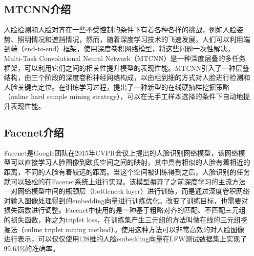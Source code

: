\subsection{MTCNN介绍}
人脸检测和人脸对齐在一些不受控制的条件下有着各种各样的挑战，例如人脸姿势、照明情况和遮挡情况，然而，随着深度学习技术的飞速发展，人们可以利用端到端（end-to-end）框架，使用深度卷积网络模型，将这些问题一次性解决。Multi-Task Convolutional Neural Network（MTCNN\cite{mtcnn}）是一种深度层叠的多任务框架，可以利用它们之间的相关性提升模型的表现性能。MTCNN引入了一种层叠结构，由三个阶段的深度卷积神经网络构成，以由粗到细的方式对人脸进行检测和人脸关键点定位。在训练学习过程，提出了一种新型的在线硬抽样挖掘策略（online hard sample mining strategy），可以在无手工样本选择的条件下自动地提升表现性能。

\subsection{Facenet介绍}

Facenet\cite{facenet}是Google团队在2015年CVPR会议上提出的人脸识别网络模型，该网络模型可以直接学习人脸图像到欧氏空间之间的映射，其中具有相似的人脸有着相近的距离，不同的人脸有着较远的距离。当这个空间被训练得到之后，人脸识别的任务就可以轻松的在Facenet系统上进行实现。该模型摒弃了之前深度学习的主流方法---对网络模型中间的瓶颈层（bottleneck layer）进行训练，而是通过深度卷积网络对输入图像处理得到的embedding向量进行训练优化。改变了训练目标，也需要对损失函数进行调整。Facenet中使用的是一种基于粗略对齐的匹配、不匹配三元组的损失函数，称之为triplet loss，在训练集产生三元组的方法叫做在线的三元组挖掘法（online triplet mining method）。使用这种方法可以非常高效的对人脸图像进行表示，可以仅仅使用128维的人脸embedding向量在LFW测试数据集上实现了99.63\%的准确率。